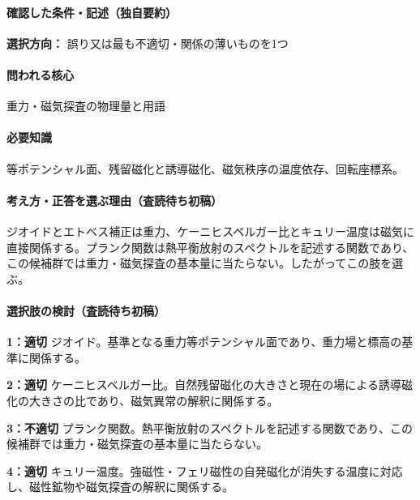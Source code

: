 \paragraph{確認した条件・記述（独自要約）}\mbox{}\par

\noindent\textbf{選択方向：} 誤り又は最も不適切・関係の薄いものを1つ\par

\paragraph{問われる核心} 重力・磁気探査の物理量と用語

\paragraph{必要知識} 等ポテンシャル面、残留磁化と誘導磁化、磁気秩序の温度依存、回転座標系。

\paragraph{考え方・正答を選ぶ理由（査読待ち初稿）} ジオイドとエトベス補正は重力、ケーニヒスベルガー比とキュリー温度は磁気に直接関係する。プランク関数は熱平衡放射のスペクトルを記述する関数であり、この候補群では重力・磁気探査の基本量に当たらない。したがってこの肢を選ぶ。

\paragraph{選択肢の検討（査読待ち初稿）}\mbox{}\par

\noindent\textbf{1：適切} ジオイド。基準となる重力等ポテンシャル面であり、重力場と標高の基準に関係する。\par

\noindent\textbf{2：適切} ケーニヒスベルガー比。自然残留磁化の大きさと現在の場による誘導磁化の大きさの比であり、磁気異常の解釈に関係する。\par

\noindent\textbf{3：不適切} プランク関数。熱平衡放射のスペクトルを記述する関数であり、この候補群では重力・磁気探査の基本量に当たらない。\par

\noindent\textbf{4：適切} キュリー温度。強磁性・フェリ磁性の自発磁化が消失する温度に対応し、磁性鉱物や磁気探査の解釈に関係する。\par

